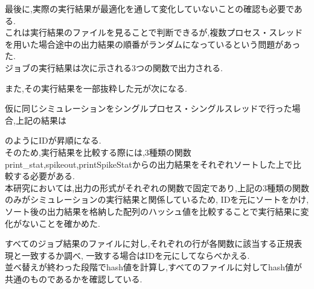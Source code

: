 最後に,実際の実行結果が最適化を通して変化していないことの確認も必要である.\\
これは実行結果のファイルを見ることで判断できるが,複数プロセス・スレッドを用いた場合途中の出力結果の順番がランダムになっているという問題があった.\\
ジョブの実行結果は次に示される3つの関数で出力される.\\
{\footnotesize

}
また,その実行結果を一部抜粋した元が次になる.\\
{\footnotesize

}
仮に同じシミュレーションをシングルプロセス・シングルスレッドで行った場合,上記の結果は
{\footnotesize

}
のようにIDが昇順になる.\\
そのため,実行結果を比較する際には,3種類の関数print\_stat,spikeout,printSpikeStatからの出力結果をそれぞれソートした上で比較する必要がある.\\
本研究においては,出力の形式がそれぞれの関数で固定であり,上記の3種類の関数のみがシミュレーションの実行結果と関係しているため,
IDを元にソートをかけ,ソート後の出力結果を格納した配列のハッシュ値を比較することで実行結果に変化がないことを確かめた.\\
{\footnotesize

}
すべてのジョブ結果のファイルに対し,それぞれの行が各関数に該当する正規表現と一致するか調べ,
一致する場合はIDを元にしてならべかえる.\\
並べ替えが終わった段階でhash値を計算し,すべてのファイルに対してhash値が共通のものであるかを確認している.\\
